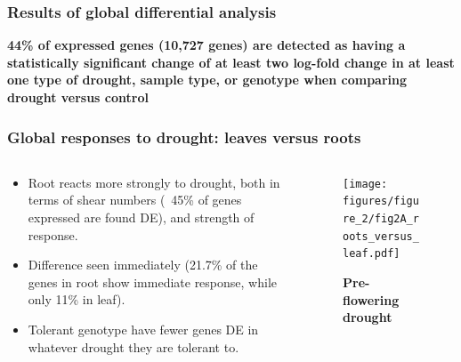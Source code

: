\documentclass[xcolor=dvipsnames]{beamer}
\begin{document}
\begin{frame}
\frametitle{Results of global differential analysis}
{\bf 44\% of expressed genes
(10,727 genes) are detected as having a statistically significant change of at
least two log-fold change in at least one type of drought, sample type, or genotype  when
comparing drought versus control}

\vspace{2em}
{\scriptsize

}
\end{frame}

\begin{frame}
\frametitle{Global responses to drought: leaves versus roots}
\begin{columns}
\begin{column}{0.6\linewidth}
\begin{itemize}[label={$\bullet$}]
\item Root reacts more strongly to drought, both in terms of shear numbers (~45\% of
genes expressed are found DE), and strength of response.
\item Difference seen immediately (21.7\% of the genes in root show immediate
response, while only 11\% in leaf).
\item Tolerant genotype have fewer genes DE in whatever drought they are tolerant
to.
\end{itemize}
\end{column}
\begin{column}{0.4\linewidth}
\begin{figure}
\texttt{[image: figures/figure\_2/fig2A\_roots\_versus\_leaf.pdf]}
\begin{center}
\caption{\small \textbf{Pre-flowering drought}}
\end{center}
\end{figure}
\end{column}
\end{columns}
\end{frame}
\end{document}

